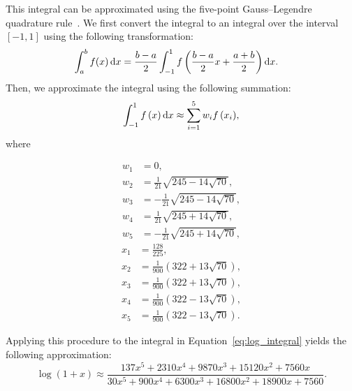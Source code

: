 This integral can be approximated using the five-point Gauss--Legendre quadrature rule~\cite{kythe_quadrature_2002}. We first convert the integral to an integral over the interval $[-1,1]$ using the following transformation:
\begin{align*}
	\int_a^b{f(x)\mathop{}\!\mathrm{d} x}
	&= \frac{b-a}{2}\int_{-1}^{1}{f\left(\frac{b-a}{2}x+\frac{a+b}{2}\right)\mathop{}\!\mathrm{d} x}.
\end{align*}
Then, we approximate the integral using the following summation:
\begin{equation*}
	\int_{-1}^{1}{f\left(x\right)\mathop{}\!\mathrm{d} x} \approx \sum_{i=1}^{5}{w_i f\left(x_i\right)},
\end{equation*}
where
\begin{multicols}{2}
	\noindent
	\begin{align*}
		w_1 &= 0,\\
		w_2 &= \frac{1}{21}\sqrt{245-14\sqrt{70}},\\
		w_3 &= -\frac{1}{21}\sqrt{245-14\sqrt{70}},\\
		w_4 &= \frac{1}{21}\sqrt{245+14\sqrt{70}},\\
		w_5 &= -\frac{1}{21}\sqrt{245+14\sqrt{70}},
	\end{align*}
	\columnbreak
	\begin{align*}
		x_1 &= \frac{128}{225},\\
		x_2 &= \frac{1}{900}\left( 322 + 13\sqrt{70}\right),\\
		x_3 &= \frac{1}{900}\left( 322 + 13\sqrt{70}\right),\\
		x_4 &= \frac{1}{900}\left( 322 - 13\sqrt{70}\right),\\
		x_5 &= \frac{1}{900}\left( 322 - 13\sqrt{70}\right).
	\end{align*}
\end{multicols}
Applying this procedure to the integral in Equation~\ref{eq:log_integral} yields the following approximation:
\begin{equation}\label{eq:standard_logarithm_quadrature}
	\log\left(1+x\right) \approx
	\frac{137x^5 + 2310x^4 + 9870x^3 + 15120x^2 + 7560x}
	{30x^5 + 900x^4 + 6300x^3 + 16800x^2 + 18900x + 7560}.
\end{equation}

